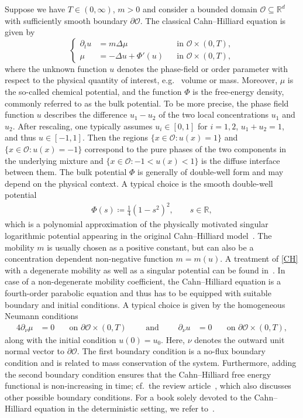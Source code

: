 \documentclass[reqno]{amsart}
\newcommand{\R}{\mathbb{R}}
\newcommand{\sO}{\mathscr{O}}
\newcommand{\seq}{\subseteq}
\newcommand{\1}{\mathbf{1}}
\begin{document}
Suppose we have $T \in (0,\infty)$, $m>0$ and consider a bounded domain $\sO \seq \mathbb{R}^d$ with sufficiently smooth boundary $\partial\sO$. The classical Cahn--Hilliard equation is given by
\begin{equation}
\left\{
\begin{aligned}
\partial_t u &= m \Delta  \mu && \text{in } \sO \times (0,T),\\
\mu &= - \Delta u+ \Phi'(u) && \text{in } \sO \times (0,T),
\end{aligned}
\right.
\label{CH}
\end{equation}
where the unknown function $u$ denotes the phase-field or order parameter with respect to the physical quantity of interest, e.g.~ volume or mass. 
Moreover, $\mu$ is the so-called chemical potential, and the function $\Phi$ is the free-energy density, commonly referred to as the bulk potential.
To be more precise, the phase field function $u$ describes the difference $u_1-u_2$ of the two local concentrations $u_1$ and $u_2$. After rescaling, one typically assumes $u_i\in [0,1]$ for $i=1,2$, $u_1+u_2=1$, and thus $u\in [-1,1]$. Then the regions $\{x\in \sO\colon u(x) = 1\}$  and $\{x\in \sO \colon u(x) = -1\}$ correspond to the pure phases of the two components in the underlying mixture and $\{x\in \sO \colon -1<u (x) < 1\}$ is the diffuse interface between them. The bulk potential $\Phi$ is generally of double-well form and may depend on the physical context. A typical choice is the
smooth double-well potential 
\begin{align*}
    \Phi(s)\coloneq \frac{1}{4}(1-s^2)^2,\qquad s\in\R,
\end{align*}
which is a polynomial approximation of the physically motivated singular logarithmic potential appearing in the original Cahn--Hilliard model~\cite{CahnHilliard1958}. The mobility $m$ is usually chosen as a positive constant, but can also be a concentration dependent non-negative function $m=m(u)$.
A treatment of \eqref{CH} with a degenerate mobility as well as a singular potential can be found in~\cite{Garcke1996}.
In case of a non-degenerate mobility coefficient, the Cahn--Hilliard equation is a fourth-order parabolic equation and thus has to be equipped with suitable boundary and initial conditions. A typical choice is given by the homogeneous Neumann conditions
\begin{alignat}{4}
    \partial_\nu \mu &= 0 \quad & \text{on } \partial\sO\times(0,T) \qquad \text{ and } \qquad
    \partial_\nu u&= 0 \quad & \text{on } \partial\sO\times(0,T),
\end{alignat}
along with the initial condition $u(0)=u_0$.
Here, $\nu$ denotes the outward unit normal vector to $\partial\sO$.
The first boundary condition is a no-flux boundary condition and is related to mass conservation of the system. Furthermore, adding the second boundary condition ensures that the Cahn--Hilliard free energy functional 
is non-increasing in time; cf.\ the review article~\cite{Wu2022}, which also discusses other possible boundary conditions. For a book solely devoted to the Cahn--Hilliard equation in the deterministic setting, we refer to~\cite{Miranville2019}. 
\end{document}
